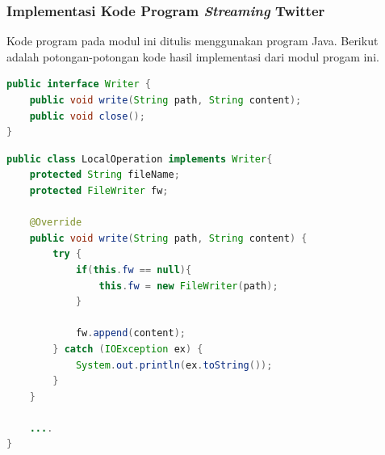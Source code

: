 \subsubsection{Implementasi Kode Program \textit{Streaming} Twitter}
Kode program pada modul ini ditulis menggunakan program Java. Berikut adalah potongan-potongan kode hasil implementasi dari modul progam ini. 

\begin{lstlisting}[language=Java,basicstyle=\tiny,caption=Writer.java,label={lst:kode_writer}]
public interface Writer {
    public void write(String path, String content);
    public void close();
}
\end{lstlisting}

\begin{lstlisting}[language=Java,basicstyle=\tiny,caption=LocalOperation.java,label={lst:kode_local_operation}]
public class LocalOperation implements Writer{
    protected String fileName;
    protected FileWriter fw;

    @Override
    public void write(String path, String content) {
        try {
            if(this.fw == null){
                this.fw = new FileWriter(path);
            }
            
            fw.append(content);
        } catch (IOException ex) {
            System.out.println(ex.toString());
        }
    }
    
    ....
}
\end{lstlisting}

